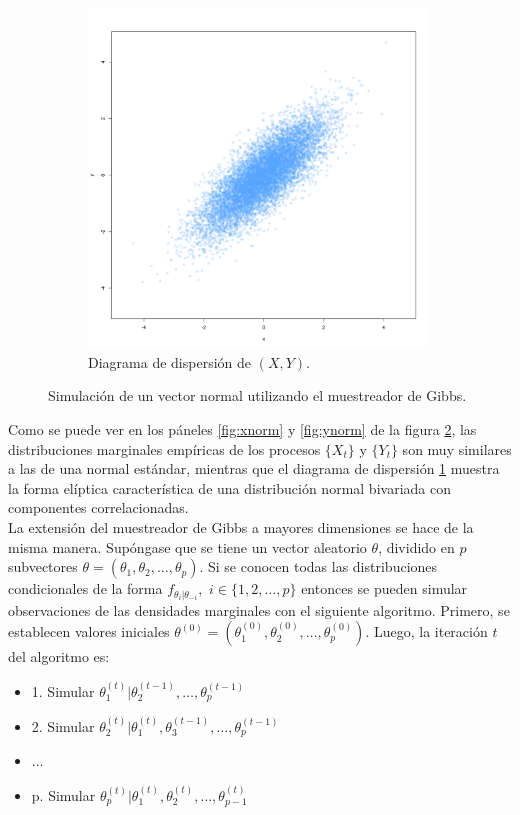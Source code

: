 \documentclass[11pt,a4paper]{article}
\begin{document}
\begin{figure}[!p]
    \vspace{0.2cm}
    \begin{subfigure}[t]{\textwidth}
    \centering
        \includegraphics[width=9cm]{bivnorm.png} 
        \caption{Diagrama de dispersión de $(X, Y)$.} \label{fig:bivnorm}
    \end{subfigure}
    \caption{Simulación de un vector normal utilizando el muestreador de Gibbs.}
    \label{fig:gs_norm}
\end{figure}

Como se puede ver en los páneles \ref{fig:xnorm} y \ref{fig:ynorm} de la figura \ref{fig:gs_norm}, las distribuciones marginales empíricas de los procesos $\lbrace X_t \rbrace$ y $\lbrace Y_t \rbrace$ son muy similares a las de una normal estándar, mientras que el diagrama de dispersión \ref{fig:bivnorm} muestra la forma elíptica característica de una distribución normal bivariada con componentes correlacionadas.\\

La extensión del muestreador de Gibbs a mayores dimensiones se hace de la misma manera. Supóngase que se tiene un vector aleatorio $\theta$, dividido en $p$ subvectores $\theta = (\theta_1, \theta_2, \dots, \theta_p)$. Si se conocen todas las distribuciones condicionales de la forma $f_{\theta_i | \theta_{-i}},$ $i \in \lbrace 1, 2, \dots, p\rbrace$ entonces se pueden simular observaciones de las densidades marginales con el siguiente algoritmo. Primero, se establecen valores iniciales $\theta^{(0)} = (\theta_1^{(0)}, \theta_2^{(0)}, \dots, \theta_p^{(0)})$. Luego, la iteración $t$ del algoritmo es:

\begin{itemize}
\item[] 1. Simular $\theta_1^{(t)} | \theta_2^{(t-1)}, \dots, \theta_p^{(t-1)}$
\item[] 2. Simular $\theta_2^{(t)} | \theta_1^{(t)}, \theta_3^{(t-1)}, \dots, \theta_p^{(t-1)}$
\item[] $\dots$
\item[] p. Simular $\theta_p^{(t)} | \theta_1^{(t)}, \theta_2^{(t)}, \dots, \theta_{p-1}^{(t)}$
\end{itemize}
\end{document}
